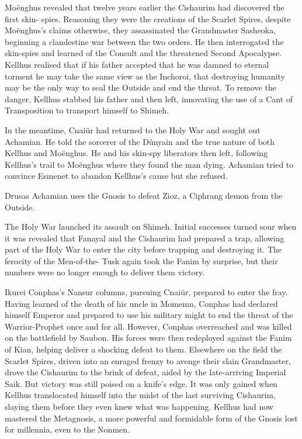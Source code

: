 \documentclass[]{book}
\begin{document}
Moënghus revealed that twelve years earlier the Cishaurim had discovered the first skin-
spies. Reasoning they were the creations of the Scarlet Spires, despite Moënghus's
claims otherwise, they assassinated the Grandmaster Sasheoka, beginning a clandestine
war between the two orders. He then interrogated the skin-spies and learned of the
Consult and the threatened Second Apocalypse. Kellhus realised that if his father
accepted that he was damned to eternal torment he may take the same view as the
Inchoroi, that destroying humanity may be the only way to seal the Outside and end
the threat. To remove the danger, Kellhus stabbed his father and then left, innovating
the use of a Cant of Transposition to transport himself to Shimeh.

In the meantime, Cnaiür had returned to the Holy War and sought out Achamian. He
told the sorcerer of the Dûnyain and the true nature of both Kellhus and Moënghus.
He and his skin-spy liberators then left, following Kellhus's trail to Moënghus where
they found the man dying. Achamian tried to convince Esmenet to abandon Kellhus's
cause but she refused.

Drusas Achamian uses the Gnosis to defeat Zioz, a Ciphrang demon from the Outside.

The Holy War launched its assault on Shimeh. Initial successes turned sour when it was
revealed that Fanayal and the Cishaurim had prepared a trap, allowing part of the Holy
War to enter the city before trapping and destroying it. The ferocity of the Men-of-the-
Tusk again took the Fanim by surprise, but their numbers were no longer enough to
deliver them victory.

Ikurei Conphas's Nansur columns, pursuing Cnaiür, prepared to enter the fray. Having
learned of the death of his uncle in Momemn, Conphas had declared himself Emperor
and prepared to use his military might to end the threat of the Warrior-Prophet once
and for all. However, Conphas overreached and was killed on the battlefield by
Saubon. His forces were then redeployed against the Fanim of Kian, helping deliver a
shocking defeat to them. Elsewhere on the field the Scarlet Spires, driven into an
enraged frenzy to avenge their slain Grandmaster, drove the Cishaurim to the brink of
defeat, aided by the late-arriving Imperial Saik. But victory was still poised on a knife's
edge. It was only gained when Kellhus translocated himself into the midst of the last
surviving Cishaurim, slaying them before they even knew what was happening. Kellhus
had now mastered the Metagnosis, a more powerful and formidable form of the Gnosis
lost for millennia, even to the Nonmen.
\end{document}
